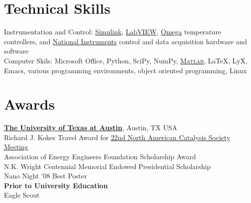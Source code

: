 \documentclass[centered]{res}
\begin{document}
\begin{resume}
\section{Technical Skills}
% 
Instrumentation and Control:
\href{http://www.mathworks.com/products/simulink/}{Simulink},
\href{http://www.ni.com/}{LabVIEW}, 
\href{http://www.omega.com/}{Omega} temperature controllers,
and
\href{http://www.ni.com}{National Instruments}
control and data acquisition hardware and software
\vspace{5pt} \\
%
Computer Skils: Microsoft Office, Python, SciPy, NumPy,
\href{http://www.mathworks.com/products/matlab/}{\textsc{Matlab}},
\LaTeX, LyX, Emacs, various programming environments, object oriented
programming, Linux
%

\section{Awards}
% 
\href{http://www.utexas.edu/}{\textbf{The University of Texas at
    Austin}}, Austin, TX USA \\
Richard J. Kokes Travel Award for
\href{http://www.22nam.org/}{22nd North American Catalysis Society
  Meeting} \\
Association of Energy Engineers Foundation Scholarship Award \\
N.K. Wright Centennial Memorial Endowed Presidential Scholarship \\
Nano Night '08 Best Poster \vspace{5pt} \\
%
\textbf{Prior to University Education} \\
Eagle Scout

\end{resume}
\end{document}
